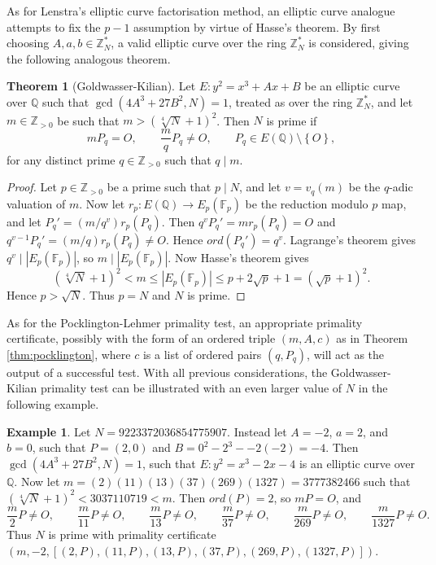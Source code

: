 \documentclass{article}
\newcommand{\F}{\mathbb{F}}
\newcommand{\Z}{\mathbb{Z}}
\newcommand{\Q}{\mathbb{Q}}
\newcommand{\rb}[1]{\left( #1 \right)}
\renewcommand{\sb}[1]{\left[ #1 \right]}
\newcommand{\cb}[1]{\left\{ #1 \right\}}
\newcommand{\abs}[1]{\left\lvert #1 \right\rvert}
\theoremstyle{definition}\newtheorem*{definition}{Definition}
\theoremstyle{definition}\newtheorem*{example}{Example}
\theoremstyle{definition}\newtheorem*{remark}{Remark}
\newtheorem{theorem}[proposition]{Theorem}
\begin{document}
As for Lenstra's elliptic curve factorisation method, an elliptic curve analogue attempts to fix the $ p - 1 $ assumption by virtue of Hasse's theorem. By first choosing $ A, a, b \in \Z_N^* $, a valid elliptic curve over the ring $ \Z_N^* $ is considered, giving the following analogous theorem.

\begin{theorem}[Goldwasser-Kilian]
Let $ E : y^2 = x^3 + Ax + B $ be an elliptic curve over $ \Q $ such that $ \gcd\rb{4A^3 + 27B^2, N} = 1 $, treated as over the ring $ \Z_N^* $, and let $ m \in \Z_{> 0} $ be such that $ m > \rb{\sqrt[4]{N} + 1}^2 $. Then $ N $ is prime if
$$ mP_q = O, \qquad \dfrac{m}{q}P_q \ne O, \qquad P_q \in E\rb{\Q} \setminus \cb{O}, $$
for any distinct prime $ q \in \Z_{> 0} $ such that $ q \mid m $.
\end{theorem}

\begin{proof}
Let $ p \in \Z_{> 0} $ be a prime such that $ p \mid N $, and let $ v = v_q\rb{m} $ be the $ q $-adic valuation of $ m $. Now let $ r_p : E\rb{\Q} \to E_p\rb{\F_p} $ be the reduction modulo $ p $ map, and let $ P_q' = \rb{m / q^v}r_p\rb{P_q} $. Then $ q^vP_q' = mr_p\rb{P_q} = O $ and $ q^{v - 1}P_q' = \rb{m / q}r_p\rb{P_q} \ne O $. Hence $ ord\rb{P_q'} = q^v $. Lagrange's theorem gives $ q^v \mid \abs{E_p\rb{\F_p}} $, so $ m \mid \abs{E_p\rb{\F_p}} $. Now Hasse's theorem gives
$$ \rb{\sqrt[4]{N} + 1}^2 < m \le \abs{E_p\rb{\F_p}} \le p + 2\sqrt{p} + 1 = \rb{\sqrt{p} + 1}^2. $$
Hence $ p > \sqrt{N} $. Thus $ p = N $ and $ N $ is prime.
\end{proof}

As for the Pocklington-Lehmer primality test, an appropriate primality certificate, possibly with the form of an ordered triple $ \rb{m, A, c} $ as in Theorem \ref{thm:pocklington}, where $ c $ is a list of ordered pairs $ \rb{q, P_q} $, will act as the output of a successful test. With all previous considerations, the Goldwasser-Kilian primality test can be illustrated with an even larger value of $ N $ in the following example.

\begin{example}
Let $ N = 9223372036854775907 $. Instead let $ A = -2 $, $ a = 2 $, and $ b = 0 $, such that $ P = \rb{2, 0} $ and $ B = 0^2 - 2^3 - -2\rb{-2} = -4 $. Then $ \gcd\rb{4A^3 + 27B^2, N} = 1 $, such that $ E : y^2 = x^3 - 2x - 4 $ is an elliptic curve over $ \Q $. Now let $ m = \rb{2}\rb{11}\rb{13}\rb{37}\rb{269}\rb{1327} = 3777382466 $ such that $ \rb{\sqrt[4]{N} + 1}^2 < 3037110719 < m $. Then $ ord\rb{P} = 2 $, so $ mP = O $, and
$$ \dfrac{m}{2}P \ne O, \qquad \dfrac{m}{11}P \ne O, \qquad \dfrac{m}{13}P \ne O, \qquad \dfrac{m}{37}P \ne O, \qquad \dfrac{m}{269}P \ne O, \qquad \dfrac{m}{1327}P \ne O. $$
Thus $ N $ is prime with primality certificate $ \rb{m, -2, \sb{\rb{2, P}, \rb{11, P}, \rb{13, P}, \rb{37, P}, \rb{269, P}, \rb{1327, P}}} $.
\end{example}
\end{document}
